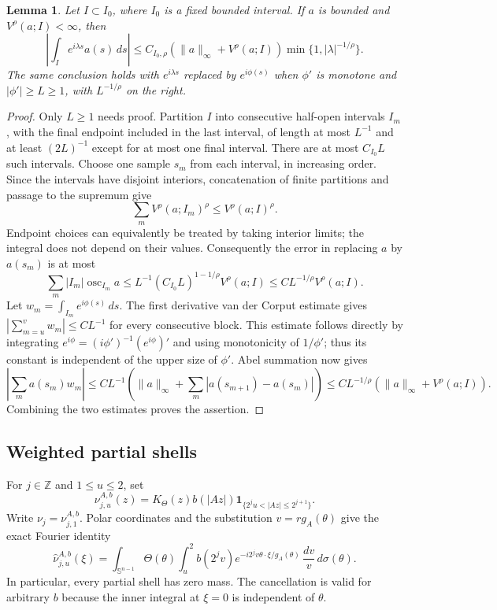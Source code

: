 \documentclass[11pt]{article}
\numberwithin{equation}{section}
\newtheorem{lemma}[theorem]{Lemma}
\theoremstyle{remark}
\theoremstyle{definition}
\begin{document}
\begin{lemma}\label{radialmod:linear-vdc}
Let $I\subset I_0$, where $I_0$ is a fixed bounded interval. If $a$ is bounded
and $V^\rho(a;I)<\infty$, then
\[
 \left|\int_I e^{i\lambda s}a(s)\,ds\right|
 \le C_{I_0,\rho}(\|a\|_\infty+V^\rho(a;I))
       \min\{1,|\lambda|^{-1/\rho}\}.
\]
The same conclusion holds with $e^{i\lambda s}$ replaced by $e^{i\phi(s)}$
when $\phi'$ is monotone and $|\phi'|\ge L\ge1$, with $L^{-1/\rho}$
on the right.
\end{lemma}
\begin{proof}
Only $L\ge1$ needs proof. Partition $I$ into consecutive half-open
intervals $I_m$, with the final endpoint included in the last interval,
of length at most $L^{-1}$ and at least $(2L)^{-1}$ except for at most
one final interval. There are at most $C_{I_0}L$ such intervals. Choose
one sample $s_m$ from each interval, in increasing order. Since the
intervals have disjoint interiors, concatenation of finite partitions
and passage to the supremum give
\[
 \sum_mV^\rho(a;I_m)^\rho\le V^\rho(a;I)^\rho.
\]
Endpoint choices can equivalently be treated by taking interior limits;
the integral does not depend on their values. Consequently the error
in replacing $a$ by $a(s_m)$ is at most
\[
 \sum_m|I_m|\operatorname{osc}_{I_m}a
 \le L^{-1}(C_{I_0}L)^{1-1/\rho}V^\rho(a;I)
 \le C L^{-1/\rho}V^\rho(a;I).
\]
Let $w_m=\int_{I_m}e^{i\phi(s)}\,ds$. The first derivative van der
Corput estimate gives $|\sum_{m=u}^vw_m|\le C L^{-1}$ for every
consecutive block. This estimate follows directly by integrating
$e^{i\phi}=(i\phi')^{-1}(e^{i\phi})'$ and using monotonicity of
$1/\phi'$; thus its constant is independent of the upper size of
$\phi'$. Abel summation now gives
\[
 \left|\sum_m a(s_m)w_m\right|
 \le C L^{-1}\left(\|a\|_\infty+
               \sum_m|a(s_{m+1})-a(s_m)|\right)
 \le C L^{-1/\rho}(\|a\|_\infty+V^\rho(a;I)).
\]
Combining the two estimates proves the assertion.
\end{proof}

\subsection{Weighted partial shells}

For $j\in\mathbb Z$ and $1\le u\le2$, set
\[
 \nu^{A,b}_{j,u}(z)
 =K_\Theta(z)b(|Az|)\mathbf1_{\{2^ju<|Az|\le2^{j+1}\}}.
\]
Write $\nu_j=\nu^{A,b}_{j,1}$. Polar coordinates and the substitution
$v=r g_A(\theta)$ give the exact Fourier identity
\begin{equation}\label{mod:shell-multiplier}
 \widehat\nu^{A,b}_{j,u}(\xi)
 =\int_{\mathbb S^{n-1}}\Theta(\theta)
       \int_u^2 b(2^jv)
       e^{-i2^jv\theta\cdot\xi/g_A(\theta)}\,\frac{dv}{v}
       \,d\sigma(\theta).
\end{equation}
In particular, every partial shell has zero mass. The cancellation is
valid for arbitrary $b$ because the inner integral at $\xi=0$ is
independent of $\theta$.
\end{document}
